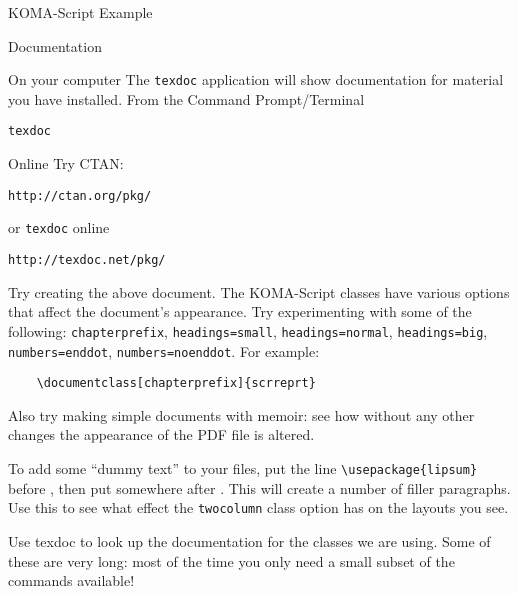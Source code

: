 \begin{frame}[fragile]{KOMA-Script Example}

  

\end{frame}

\begin{frame}{Documentation}

  \begin{block}{On your computer}
    The \texttt{texdoc} application will show documentation for 
    material you have installed. From the Command Prompt/Terminal
    \begin{center}
      \texttt{texdoc }
    \end{center}
  \end{block}
  
  \begin{block}{Online}
    Try CTAN:
    \begin{center}
      \texttt{http://ctan.org/pkg/}
    \end{center}
    or \texttt{texdoc} online
    \begin{center}
      \texttt{http://texdoc.net/pkg/}
    \end{center}
  \end{block}

\end{frame}

\begin{exercise}
  Try creating the above document. The KOMA-Script classes have
  various options that affect the document's appearance. Try
  experimenting with some of the following: \texttt{chapterprefix}, 
  \texttt{headings=small}, \texttt{headings=normal},
  \texttt{headings=big}, \texttt{numbers=enddot},
  \texttt{numbers=noenddot}.  For example:
  \begin{verbatim}
    \documentclass[chapterprefix]{scrreprt}
  \end{verbatim}
  
  Also try making simple documents with \textsf{memoir}:
  see how without any other changes the appearance of the PDF
  file is altered.
  
  To add some \enquote{dummy text} to your files, put the line
  \verb"\usepackage{lipsum}" before \verb"", then
  put  somewhere after \verb"". This 
  will create a number of filler paragraphs. Use this to see what effect
  the \texttt{twocolumn} class option has on the layouts you see.
  
  Use \textsf{texdoc} to look up the documentation for the classes
  we are using. Some of these are very long: most of the time you only
  need a small subset of the commands available!
\end{exercise}

